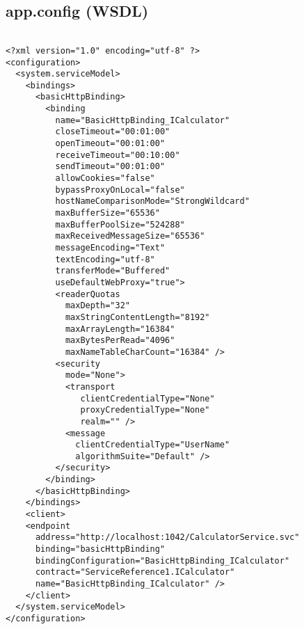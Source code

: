 	\subsection{app.config (WSDL)}
	\begin{verbatim} 
		
<?xml version="1.0" encoding="utf-8" ?>
<configuration>
  <system.serviceModel>
    <bindings>
      <basicHttpBinding>
        <binding 
          name="BasicHttpBinding_ICalculator" 
          closeTimeout="00:01:00"
          openTimeout="00:01:00"
          receiveTimeout="00:10:00" 
          sendTimeout="00:01:00"
          allowCookies="false" 
          bypassProxyOnLocal="false" 
          hostNameComparisonMode="StrongWildcard"
          maxBufferSize="65536" 
          maxBufferPoolSize="524288" 
          maxReceivedMessageSize="65536"
          messageEncoding="Text" 
          textEncoding="utf-8" 
          transferMode="Buffered"
          useDefaultWebProxy="true">
          <readerQuotas 
            maxDepth="32" 
            maxStringContentLength="8192" 
            maxArrayLength="16384"
            maxBytesPerRead="4096" 
            maxNameTableCharCount="16384" />
          <security 
            mode="None">
            <transport 
               clientCredentialType="None" 
               proxyCredentialType="None" 
               realm="" />
            <message 
              clientCredentialType="UserName" 
              algorithmSuite="Default" />
          </security>
        </binding>
      </basicHttpBinding>
    </bindings>
    <client>
    <endpoint 
      address="http://localhost:1042/CalculatorService.svc"
      binding="basicHttpBinding" 
      bindingConfiguration="BasicHttpBinding_ICalculator"
      contract="ServiceReference1.ICalculator" 
      name="BasicHttpBinding_ICalculator" />
    </client>
  </system.serviceModel>
</configuration>
	
	\end{verbatim}

	\newpage
